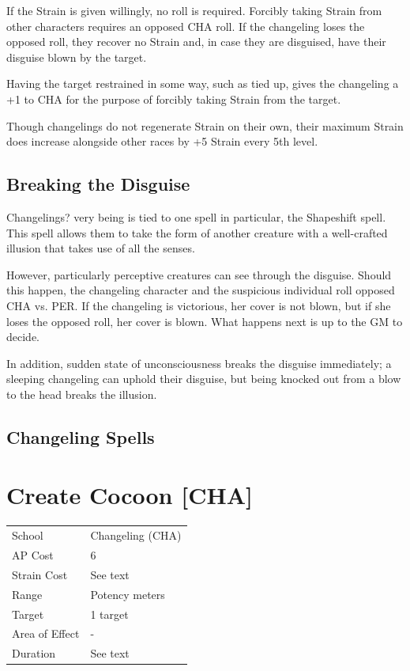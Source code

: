 \documentclass[11pt,a4paper,twocolumn]{book}
\begin{document}
	If the Strain is given willingly, no roll is required. Forcibly taking Strain from other characters requires an opposed CHA roll. If the changeling loses the opposed roll, they recover no Strain and, in case they are disguised, have their disguise blown by the target.
	
	Having the target restrained in some way, such as tied up, gives the changeling a +1 to CHA for the purpose of forcibly taking Strain from the target.
	
	Though changelings do not regenerate Strain on their own, their maximum Strain does increase alongside other races by +5 Strain every 5th level.
	
	\subsection*{Breaking the Disguise}
	Changelings? very being is tied to one spell in particular, the Shapeshift spell. This spell allows them to take the form of another creature with a well-crafted illusion that takes use of all the senses. 
	
	However, particularly perceptive creatures can see through the disguise. Should this happen, the changeling character and the suspicious individual roll opposed CHA vs. PER. If the changeling is victorious, her cover is not blown, but if she loses the opposed roll, her cover is blown. What happens next is up to the GM to decide.
	
	In addition, sudden state of unconsciousness breaks the disguise immediately; a sleeping changeling can uphold their disguise, but being knocked out from a blow to the head breaks the illusion.
	
	\subsection*{Changeling Spells}
	
	\section*{Create Cocoon [CHA]}
	{
		\begin{tabu} to 75mm{| X[l,4] | X[l,7] |}
			\hline
			School 			&  	Changeling (CHA)\\
			AP Cost	      	&  6				\\
			Strain Cost     &  See text			\\
			Range     		&  Potency meters	\\
			Target      	&  1 target			\\
			Area of Effect  &  -	 			\\
			Duration     	&  See text			\\ \hline
		\end{tabu}
		
	}
	
\end{document}
